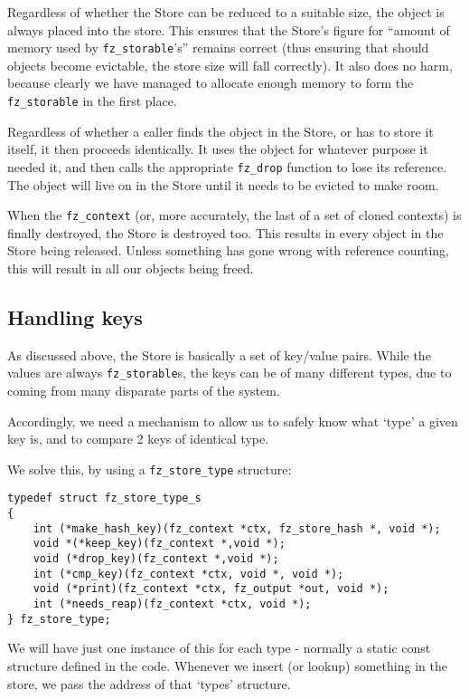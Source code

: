 \documentclass[oneside]{book}
\begin{document}
Regardless of whether the Store can be reduced to a suitable size, the object is always placed into the store. This ensures that the Store's figure for ``amount of memory used by \texttt{fz\_storable}'s'' remains correct (thus ensuring that should objects become evictable, the store size will fall correctly). It also does no harm, because clearly we have managed to allocate enough memory to form the \texttt{fz\_storable} in the first place.

Regardless of whether a caller finds the object in the Store, or has to store it itself, it then proceeds identically. It uses the object for whatever purpose it needed it, and then calls the appropriate \texttt{fz\_drop} function to lose its reference. The object will live on in the Store until it needs to be evicted to make room.

When the \texttt{fz\_context} (or, more accurately, the last of a set of cloned contexts) is finally destroyed, the Store is destroyed too. This results in every object in the Store being released. Unless something has gone wrong with reference counting, this will result in all our objects being freed. 

\subsection{Handling keys}

As discussed above, the Store is basically a set of key/value pairs. While the values are always \texttt{fz\_storable}s, the keys can be of many different types, due to coming from many disparate parts of the system.

Accordingly, we need a mechanism to allow us to safely know what `type' a given key is, and to compare 2 keys of identical type.

We solve this, by using a \texttt{fz\_store\_type} structure:

\begin{lstlisting}
typedef struct fz_store_type_s
{
	int (*make_hash_key)(fz_context *ctx, fz_store_hash *, void *);
	void *(*keep_key)(fz_context *,void *);
	void (*drop_key)(fz_context *,void *);
	int (*cmp_key)(fz_context *ctx, void *, void *);
	void (*print)(fz_context *ctx, fz_output *out, void *);
	int (*needs_reap)(fz_context *ctx, void *);
} fz_store_type;
\end{lstlisting}

We will have just one instance of this for each type - normally a static const structure defined in the code. Whenever we insert (or lookup) something in the store, we pass the address of that `types' structure.
\end{document}
